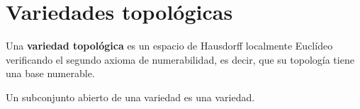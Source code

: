 
\chapter{Variedades topológicas}

\begin{definicion} Una \textbf{variedad topológica} es un espacio de Hausdorff localmente Euclídeo verificando el segundo axioma de numerabilidad, es decir, que su topología tiene una base numerable.
\end{definicion}

Un subconjunto abierto de una variedad es una variedad.

\endinput
